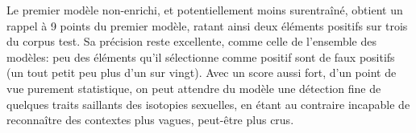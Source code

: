 Le premier modèle non-enrichi, et potentiellement moins surentraîné, obtient un rappel à 9 points du premier modèle, ratant ainsi deux éléments positifs sur trois du corpus test. Sa précision reste excellente, comme celle de l'ensemble des modèles: peu des éléments qu'il sélectionne comme positif sont de faux positifs (un tout petit peu plus d'un sur vingt). Avec un score aussi fort, d'un point de vue purement statistique, on peut attendre du modèle une détection fine de quelques traits saillants des isotopies sexuelles, en étant au contraire incapable de reconnaître des contextes plus vagues, peut-être plus crus. 

\noindent\begin{minipage}{\linewidth}%
    \resizebox{\linewidth}{!}{%
    \begin{tabular}{r|lllll|rrr}
    \toprule
     Index & Morphologie & Encodeur & Enrichissement & Embeddings & Taille encodée &  Précision &  Rappel &  Score F1 \\
    \midrule
        19 &             &  MeanMax &         Linear &       Bert &            256 &      90.20 &   \textbf{42.05} &     \textbf{57.36} \\
        18 &             &      GRU &         Linear &       Bert &            256 &      92.17 &   36.49 &     52.28 \\
        17 &             &     LSTM &           LSTM &   FastText &            256 &      96.56 &   35.08 &     51.34 \\
        16 &             &      HAN &         Linear &   Word2Vec &            128 &      96.17 &   33.79 &     49.98 \\
        15 &             &     LSTM &           LSTM &   FastText &            128 &      \textbf{97.32} &   33.23 &     49.56 \\
        14 &  Agglomérée &      GRU &                &   Word2Vec &            256 &      94.87 &   \textbf{33.11} &     \textbf{49.05} \\
        13 &  Agglomérée &     LSTM &                &   Word2Vec &            256 &      95.36 &   32.77 &     48.71 \\
        12 &  Agglomérée &     LSTM &           LSTM &   Word2Vec &            128 &      95.01 &   30.31 &     45.91 \\
        11 &             &      HAN &         Linear &       Bert &            256 &      94.27 &   30.09 &     45.61 \\
        10 &  Agglomérée &      HAN &                &   Word2Vec &            256 &      95.98 &   29.39 &     45.02 \\

\end{tabular}}
\end{minipage}
